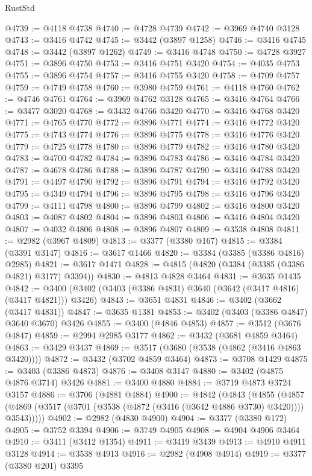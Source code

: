 \begin{lexlean}{RustStd}
\begin{coremodule}
@4739 := @4118 @4738
@4740 := @4728 @4739
@4742 := @3969 @4740 @3128
@4743 := @3416 @4742
@4745 := @3442 (@3897 @1258)
@4746 := @3416 @4745
@4748 := @3442 (@3897 @1262)
@4749 := @3416 @4748
@4750 := @4728 @3927
@4751 := @3896 @4750
@4753 := @3416 @4751 @3420
@4754 := @4035 @4753
@4755 := @3896 @4754
@4757 := @3416 @4755 @3420
@4758 := @4709 @4757
@4759 := @4749 @4758
@4760 := @3980 @4759
@4761 := @4118 @4760
@4762 := @4746 @4761
@4764 := @3969 @4762 @3128
@4765 := @3416 @4764
@4766 := @3477 @3020
@4768 := @3432 @4766 @3420
@4770 := @3416 @4768 @3420
@4771 := @4765 @4770
@4772 := @3896 @4771
@4774 := @3416 @4772 @3420
@4775 := @4743 @4774
@4776 := @3896 @4775
@4778 := @3416 @4776 @3420
@4779 := @4725 @4778
@4780 := @3896 @4779
@4782 := @3416 @4780 @3420
@4783 := @4700 @4782
@4784 := @3896 @4783
@4786 := @3416 @4784 @3420
@4787 := @4678 @4786
@4788 := @3896 @4787
@4790 := @3416 @4788 @3420
@4791 := @4497 @4790
@4792 := @3896 @4791
@4794 := @3416 @4792 @3420
@4795 := @4349 @4794
@4796 := @3896 @4795
@4798 := @3416 @4796 @3420
@4799 := @4111 @4798
@4800 := @3896 @4799
@4802 := @3416 @4800 @3420
@4803 := @4087 @4802
@4804 := @3896 @4803
@4806 := @3416 @4804 @3420
@4807 := @4032 @4806
@4808 := @3896 @4807
@4809 := @3538 @4808
@4811 := @2982 (@3967 @4809)
@4813 := @3377 (@3380 @167)
@4815 := @3384 (@3391 @3147)
@4816 := @3617 @1466
@4820 := @3384 (@3385 (@3386 @4816) @2985)
@4821 := @3617 @1471
@4828 := @4815 (@4820 (@3384 (@3385 (@3386 @4821) @3177) @3394))
@4830 := @4813 @4828 @3464
@4831 := @3635 @1435
@4842 := @3400 (@3402 (@3403 (@3386 @4831) @3640 (@3642 (@3417 @4816) (@3417 @4821))) @3426)
@4843 := @3651 @4831
@4846 := @3402 (@3662 (@3417 @4831))
@4847 := @3635 @1381
@4853 := @3402 (@3403 (@3386 @4847) @3640 @3670) @3426
@4855 := @3400 (@4846 @4853)
@4857 := @3512 (@3676 @4847)
@4859 := @2994 @2985 @3177
@4862 := @3432 (@3681 @4859 @3464)
@4863 := @3429 @3437
@4869 := @3517 (@3680 (@3538 (@4862 (@3416 @4863 @3420))))
@4872 := @3432 (@3702 @4859 @3464)
@4873 := @3708 @1429
@4875 := @3403 (@3386 @4873)
@4876 := @3408 @3147
@4880 := @3402 (@4875 @4876 @3714) @3426
@4881 := @3400 @4880
@4884 := @3719 @4873 @3724 @3157
@4886 := @3706 (@4881 @4884)
@4900 := @4842
    (@4843
      (@4855
        (@4857 (@4869 (@3517 (@3701 (@3538 (@4872 (@3416 (@3642 @4886 @3730) @3420)))) @3543)))))
@4902 := @2982 (@4830 @4900)
@4904 := @3377 (@3380 @172)
@4905 := @3752 @3394
@4906 := @3749 @4905
@4908 := @4904 @4906 @3464
@4910 := @3411 (@3412 @1354)
@4911 := @3419 @3439
@4913 := @4910 @4911 @3128
@4914 := @3538 @4913
@4916 := @2982 (@4908 @4914)
@4919 := @3377 (@3380 @201) @3395

\end{coremodule}
\end{lexlean}

